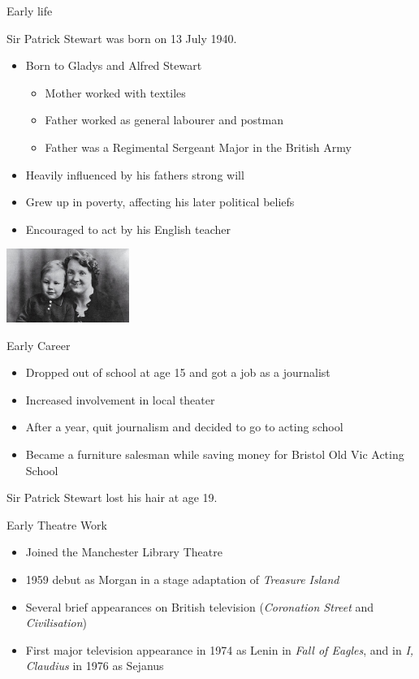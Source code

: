 \documentclass[xcolor=dvipsnames]{beamer}
\begin{document}
\begin{frame}{Early life}
  \begin{fct}
    Sir Patrick Stewart was born on 13 July 1940.
  \end{fct}
  \begin{itemize}
    \item Born to Gladys and Alfred Stewart
    \begin{itemize}
      \item Mother worked with textiles
      \item Father worked as general labourer and postman
      \item Father was a Regimental Sergeant Major in the British Army
    \end{itemize}
    \item Heavily influenced by his fathers strong will
    \item Grew up in poverty, affecting his later political beliefs
    \item Encouraged to act by his English teacher
  \end{itemize}
  \begin{center}
    \includegraphics[width=0.3\textwidth]{kid.jpg}
  \end{center}
\end{frame}

\begin{frame}{Early Career}
  \begin{itemize}
    \item Dropped out of school at age 15 and got a job as a journalist
    \item Increased involvement in local theater
    \item After a year, quit journalism and decided to go to acting school
    \item Became a furniture salesman while saving money for Bristol Old Vic
    Acting School
  \end{itemize}
  \begin{fct}
    Sir Patrick Stewart lost his hair at age 19.
  \end{fct}
\end{frame}

\begin{frame}{Early Theatre Work}
  \begin{itemize}
    \item Joined the Manchester Library Theatre
    \item 1959 debut as Morgan in a stage adaptation of \emph{Treasure Island}
    \item Several brief appearances on British television (\emph{Coronation
    Street} and \emph{Civilisation})
    \item First major television appearance in 1974 as Lenin in \emph{Fall of
    Eagles}, and in \emph{I, Claudius} in 1976 as Sejanus
  \end{itemize}
\end{frame}
\end{document}
